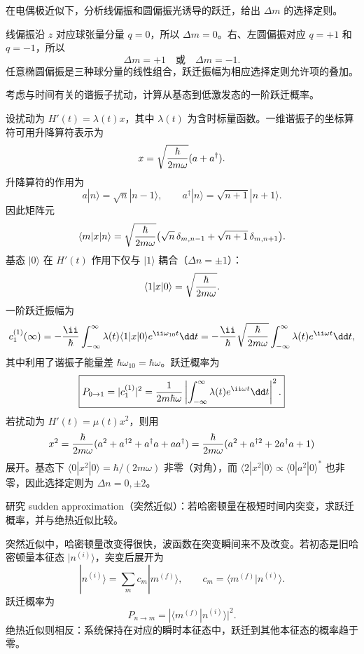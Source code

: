\begin{question}
在电偶极近似下，分析线偏振和圆偏振光诱导的跃迁，给出 $\Delta m$ 的选择定则。
\end{question}
\begin{solution}
线偏振沿 $z$ 对应球张量分量 $q=0$，所以 $\Delta m=0$。右、左圆偏振对应 $q=+1$ 和 $q=-1$，所以
\[
\Delta m=+1\quad\text{或}\quad \Delta m=-1.
\]
任意椭圆偏振是三种球分量的线性组合，跃迁振幅为相应选择定则允许项的叠加。
\end{solution}

\begin{question}
考虑与时间有关的谐振子扰动，计算从基态到低激发态的一阶跃迁概率。
\end{question}
\begin{solution}
设扰动为 $H'(t)=\lambda(t)x$，其中 $\lambda(t)$ 为含时标量函数。一维谐振子的坐标算符可用升降算符表示为
\[
x=\sqrt{\hbar\over2m\omega}(a+a^\dagger).
\]
升降算符的作用为
\[
a|n\rangle=\sqrt{n}|n-1\rangle,\qquad
a^\dagger|n\rangle=\sqrt{n+1}|n+1\rangle.
\]
因此矩阵元
\[
\langle m|x|n\rangle=\sqrt{\hbar\over2m\omega}
\big(\sqrt{n}\,\delta_{m,n-1}+\sqrt{n+1}\,\delta_{m,n+1}\big).
\]
基态 $|0\rangle$ 在 $H'(t)$ 作用下仅与 $|1\rangle$ 耦合（$\Delta n=\pm1$）：
\[
\langle1|x|0\rangle=\sqrt{\hbar\over2m\omega}.
\]
一阶跃迁振幅为
\[
c_1^{(1)}(\infty)=-{\ii\over\hbar}\int_{-\infty}^{\infty}\lambda(t)
\langle1|x|0\rangle e^{\ii\omega_{10}t}\dd t
=-{\ii\over\hbar}\sqrt{\hbar\over2m\omega}\int_{-\infty}^{\infty}\lambda(t)e^{\ii\omega t}\dd t,
\]
其中利用了谐振子能量差 $\hbar\omega_{10}=\hbar\omega$。跃迁概率为
\[
\boxed{P_{0\to1}=|c_1^{(1)}|^2
= {1\over2m\hbar\omega}\left|\int_{-\infty}^{\infty}\lambda(t)e^{\ii\omega t}\dd t\right|^2.}
\]
若扰动为 $H'(t)=\mu(t)x^2$，则用
\[
x^2={\hbar\over2m\omega}(a^2+a^{\dagger2}+a^\dagger a+aa^\dagger)
={\hbar\over2m\omega}(a^2+a^{\dagger2}+2a^\dagger a+1)
\]
展开。基态下 $\langle0|x^2|0\rangle=\hbar/(2m\omega)$ 非零（对角），而 $\langle2|x^2|0\rangle\propto\langle0|a^2|0\rangle^*$ 也非零，因此选择定则为 $\Delta n=0,\pm2$。
\end{solution}

\begin{question}
研究 sudden approximation（突然近似）：若哈密顿量在极短时间内突变，求跃迁概率，并与绝热近似比较。
\end{question}
\begin{solution}
突然近似中，哈密顿量改变得很快，波函数在突变瞬间来不及改变。若初态是旧哈密顿量本征态 $|n^{(i)}\rangle$，突变后展开为
\[
|n^{(i)}\rangle=\sum_m c_m|m^{(f)}\rangle,
\qquad
c_m=\langle m^{(f)}|n^{(i)}\rangle.
\]
跃迁概率为
\[
\boxed{P_{n\to m}=|\langle m^{(f)}|n^{(i)}\rangle|^2.}
\]
绝热近似则相反：系统保持在对应的瞬时本征态中，跃迁到其他本征态的概率趋于零。
\end{solution}

